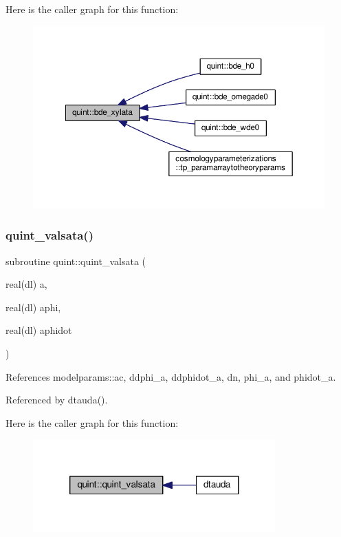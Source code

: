 Here is the caller graph for this function\+:
\nopagebreak
\begin{figure}[H]
\begin{center}
\leavevmode
\includegraphics[width=350pt]{namespacequint_a37db272f12e135ca0061bd66bfccab65_icgraph}
\end{center}
\end{figure}
\mbox{\label{namespacequint_a4f9009a5b36a9b95e58f74d25e1bb1b7}} 
\subsubsection{\texorpdfstring{quint\+\_\+valsata()}{quint\_valsata()}}
{\footnotesize\ttfamily subroutine quint\+::quint\+\_\+valsata (\begin{DoxyParamCaption}\item[{real(dl)}]{a,  }\item[{real(dl)}]{aphi,  }\item[{real(dl)}]{aphidot }\end{DoxyParamCaption})}



References modelparams\+::ac, ddphi\+\_\+a, ddphidot\+\_\+a, dn, phi\+\_\+a, and phidot\+\_\+a.



Referenced by dtauda().

Here is the caller graph for this function\+:
\nopagebreak
\begin{figure}[H]
\begin{center}
\leavevmode
\includegraphics[width=264pt]{namespacequint_a4f9009a5b36a9b95e58f74d25e1bb1b7_icgraph}
\end{center}
\end{figure}
\mbox{\label{namespacequint_aeb3b6422b8cc4a091d00b74a6c2d6bf6}} 
